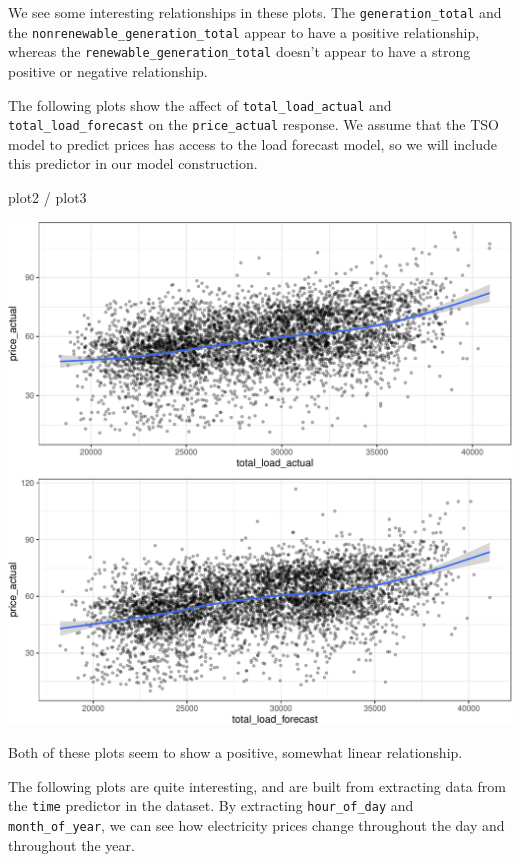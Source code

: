 \documentclass[
]{article}
\newenvironment{Shaded}{\begin{snugshade}}{\end{snugshade}}
\newcommand{\NormalTok}[1]{\textcolor[rgb]{0.00,0.23,0.31}{#1}}
\newcommand{\SpecialCharTok}[1]{\textcolor[rgb]{0.37,0.37,0.37}{#1}}
\begin{document}
We see some interesting relationships in these plots. The
\texttt{generation\_total} and the
\texttt{nonrenewable\_generation\_total} appear to have a positive
relationship, whereas the \texttt{renewable\_generation\_total} doesn't
appear to have a strong positive or negative relationship.

The following plots show the affect of \texttt{total\_load\_actual} and
\texttt{total\_load\_forecast} on the \texttt{price\_actual} response.
We assume that the TSO model to predict prices has access to the load
forecast model, so we will include this predictor in our model
construction.

\begin{Shaded}
\begin{Highlighting}[]
\NormalTok{plot2 }\SpecialCharTok{/}\NormalTok{ plot3}
\end{Highlighting}
\end{Shaded}

\includegraphics{Analytics_Report_files/figure-pdf/plot23-1.pdf}

Both of these plots seem to show a positive, somewhat linear
relationship.

The following plots are quite interesting, and are built from extracting
data from the \texttt{time} predictor in the dataset. By extracting
\texttt{hour\_of\_day} and \texttt{month\_of\_year}, we can see how
electricity prices change throughout the day and throughout the year.
\end{document}
